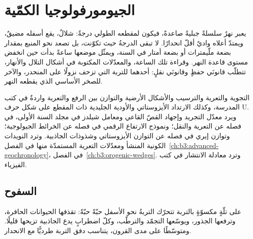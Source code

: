 \chapter{الجيومورفولوجيا الكمّية}\label{ch:b3:quantitative-geomorphology}

يعبر نهرٌ سلسلةً جبليةً صاعدةً، فيكون لمقطعه الطولي درجةٌ: شلالٌ،
يقع أسفله مضيقٌ، ويمتدّ أعلاه واديٌ أقلّ انحدارًا. لا تبقى الدرجةُ
حيث تكوّنت، بل تصعد نحو المنبع بمقدار بضعة ملّيمترات أو بضعة أمتار في
السنة، ويمثّل موضعها ساعةً بدأت حين انخفض مستوى قاعدة النهر.
وقراءة تلك الساعة، والمعدّلات المكتوبة في أشكال التلال والأنهار، تتطلّب
قانونَي حفظٍ وقانونَي نقلٍ: أحدهما للتربة التي تزحف نزولًا على المنحدر،
والآخر للصخر الأساسي الذي يقطعه النهر.

\begin{recall}
التجوية والتعرية والترسيب والأشكال الأرضية والتوازن بين الرفع والتعرية
واردةٌ في كتب المدرسة، وكذلك الارتداد الأيزوستاتي والأودية الجليدية ذات
المقطع على شكل حرف U. ويرد معدّل التجريد وإجهاد القصّ القاعي ومعامل شيلدز
في مجلد السنة الأولى، في فصله عن التعرية والنقل؛
ونموذج الارتفاع الرقمي في فصله عن الخرائط الجيولوجية؛ وتوازن إيري
في فصله عن التوازن الأيزوستاتي وشذوذات الجاذبية. وترد النويدات الكونية المنشأ
ومعدّلات التعرية المستمدّة منها في
الفصل~\ref{ch:b3:advanced-geochronology}،   في الفصل~\ref{ch:b3:orogenic-wedges}. وترد معادلة
الانتشار في كتب الفيزياء.
\end{recall}

\section{السفوح}\label{sec:b3:quantitative-geomorphology:hillslopes}

على تلّةٍ مكسوّةٍ بالتربة تتحرّك التربةُ نحو الأسفل حبّةً حبّةً: تقذفها الحيوانات
الحافرة، وترفعها الجذور، ويوسّعها التجمّد والترطّب، وكلّ
اضطرابٍ يدع الجاذبية تزيحها قليلًا. ومتوسّطًا على مدى القرون،
يتناسب دفق التربة طرديًّا مع الانحدار.

